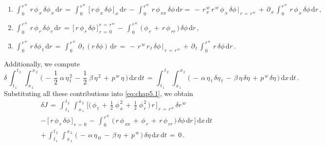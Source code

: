 \documentclass[alpha-refs, 12pt]{wiley-article}
\begin{document}
\begin{enumerate}
\item $\int_{\,0}^{\,r^{\,w}}\,r\,\phi_{\,x}\,\delta \phi_{\,x}\,\mathrm{d}r\,=\,\int_{\,0}^{\,r^{\,w}}\,\bigl[\,r\,\phi_{\,x}\,\delta \phi\,\bigr]_{\,x}\,\mathrm{d}r\,-\,\int_{\,0}^{\,r^{\,w}}\,r\,\phi_{\,xx}\,\delta \phi\,\mathrm{d}r =\,-\,r_{\,x}^{\,w}\,r^{\,w}\,\phi_{\,x}\,\delta \phi\,\biggr|_{\,r\,=\,r^{\,w}}\,+\,\partial_{\,x}\,\int_{\,0}^{\,r^{\,w}}\,r\,\phi_{\,x}\,\delta \phi\,\mathrm{d}r\,,$
\item $\int_{\,0}^{\,r^{\,w}}\,r\,\phi_{\,r}\,\delta \phi_{\,r}\,\mathrm{d}r\,=\,\bigl[\,r\,\phi_{\,r}\,\delta \phi\,\bigr]_{\,r\,=\,0}^{\,r\,=\,r^{\,w}}\,-\,\int_{\,0}^{\,r^{\,w}}\,\bigl(\,\phi_{\,r}\,+\,r\,\phi_{\,rr}\,\bigr)\,\delta \phi\,\mathrm{d}r\,,$
\item $\int_{\,0}^{\,r^{\,w}}\,r\,\delta \phi_{\,t}\,\mathrm{d}r\,=\,\int_{\,0}^{\,r^{\,w}}\,\partial_{\,t}\,(r\,\delta \phi)\,\mathrm{d}r\,=\,-\,r^{\,w}\,r_{\,t}\,\delta \phi\,\biggr|_{\,r\,=\,r^{\,w}}\,+\,\partial_{\,t}\,\int_{\,0}^{\,r^{\,w}}\,r\,\delta \phi\,\mathrm{d}r\,.$
\end{enumerate}
Additionally, we compute
\begin{equation*}
  \delta\,\int_{\,t_{\,1}}^{\,t_{\,2}}\,\int_{\,x_{\,1}}^{\,x_{\,2}}\,\biggl(\,-\,\frac{1}{2}\;\alpha\,\eta_{\,t}^{\,2}\,-\,\frac{1}{2}\;\beta\,\eta^{\,2}\,+\,p^{\,w}\,\eta\,\biggr)\,\mathrm{d}x\,\mathrm{d}t\,=\,\int_{\,t_{\,1}}^{\,t_{\,2}}\,\int_{\,x_{\,1}}^{\,x_{\,2}}\,\bigl(\,-\,\alpha\,\eta_{\,t}\,\delta \eta_{\,t}\,-\,\beta\,\eta\,\delta \eta\,+\,p^{\,w}\,\delta \eta\,\bigr)\,\mathrm{d}x\,\mathrm{d}t\,.
\end{equation*}
Substituting all these contributions into \eqref{eq:chap5.1}, we obtain
\begin{multline*}
  \delta J\,=\,\int_{\,t_{\,1}}^{\,t_{\,2}}\,\int_{\,x_{\,1}}^{\,x_{\,2}}\,\Biggl[\biggl(\,\phi_{\,t}\,+\,\frac{1}{2}\;\phi_{\,x}^{\,2}\,+\,\frac{1}{2}\;\phi_{\,r}^{\,2}\,\biggr)\,r\,\Biggr]_{\,r\,=\,r^{\,w}}\,\delta r^{\,w} \\
  -\,\bigl[\,r\,\phi_{\,r}\,\delta \phi\,\bigr]_{\,r\,=\,0} \,-\,\int_{\,0}^{\,r^{\,w}}\,\bigl(\,r\,\phi_{\,xx}\,+\,\phi_{\,r}\,+\,r\,\phi_{\,rr}\,\bigr)\,\delta \phi\,\mathrm{d}r\,\Biggr]\,\mathrm{d}x\,\mathrm{d}t \\
  +\,\int_{\,t_{\,1}}^{\,t_{\,2}}\,\int_{\,x_{\,1}}^{\,x_{\,2}}\,\bigl(\,-\,\alpha\,\eta_{\,tt}\,-\,\beta\,\eta\,+\,p^{\,w}\,\bigr)\,\delta \eta\,\mathrm{d}x\,\mathrm{d}t\,=\,0\,.
\end{multline*}
\end{document}
